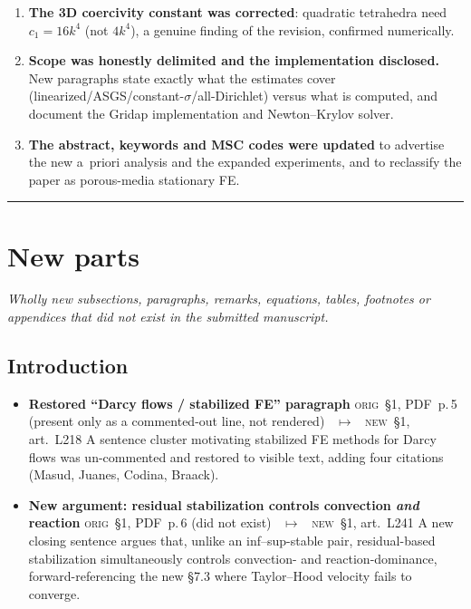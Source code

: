 \documentclass[11pt]{article}
\newcommand{\Orig}{\textcolor{origc}{\footnotesize\textsc{orig}}}
\newcommand{\New}{\textcolor{newc}{\footnotesize\textsc{new}}}
\newcommand{\pdfp}[1]{PDF~p.\,#1}
\newcommand{\artl}[1]{art.\ L#1}       %
\newcommand{\ch}[4]{%
  \item \textbf{#1}\newline
    {\footnotesize\Orig\ #2 \ \textcolor{locc}{$\longmapsto$} \ \New\ #3}\newline
    #4}
\begin{document}
\begin{enumerate}[leftmargin=1.7em,itemsep=3pt]
\item \textbf{The 3D coercivity constant was corrected}: quadratic tetrahedra need $c_1=16k^4$
  (not $4k^4$), a genuine finding of the revision, confirmed numerically.
\item \textbf{Scope was honestly delimited and the implementation disclosed.} New paragraphs state
  exactly what the estimates cover (linearized/ASGS/constant-$\sigma$/all-Dirichlet) versus what is
  computed, and document the Gridap implementation and Newton--Krylov solver.
\item \textbf{The abstract, keywords and MSC codes were updated} to advertise the new a~priori
  analysis and the expanded experiments, and to reclassify the paper as porous-media stationary FE.
\end{enumerate}

\vspace{0.4em}\hrule\vspace{0.2em}

\section{New parts}
\emph{Wholly new subsections, paragraphs, remarks, equations, tables, footnotes or appendices
that did not exist in the submitted manuscript.}

\subsection{Introduction}
\begin{itemize}
\ch{Restored ``Darcy flows / stabilized FE'' paragraph}
   {\S1, \pdfp{5} (present only as a commented-out line, not rendered)}
   {\S1, \artl{218}}
   {A sentence cluster motivating stabilized FE methods for Darcy flows was un-commented and
    restored to visible text, adding four citations (Masud, Juanes, Codina, Braack).}
\ch{New argument: residual stabilization controls convection \emph{and} reaction}
   {\S1, \pdfp{6} (did not exist)}
   {\S1, \artl{241}}
   {A new closing sentence argues that, unlike an inf--sup-stable pair, residual-based
    stabilization simultaneously controls convection- and reaction-dominance, forward-referencing
    the new \S7.3 where Taylor--Hood velocity fails to converge.}
\end{itemize}
\end{document}
